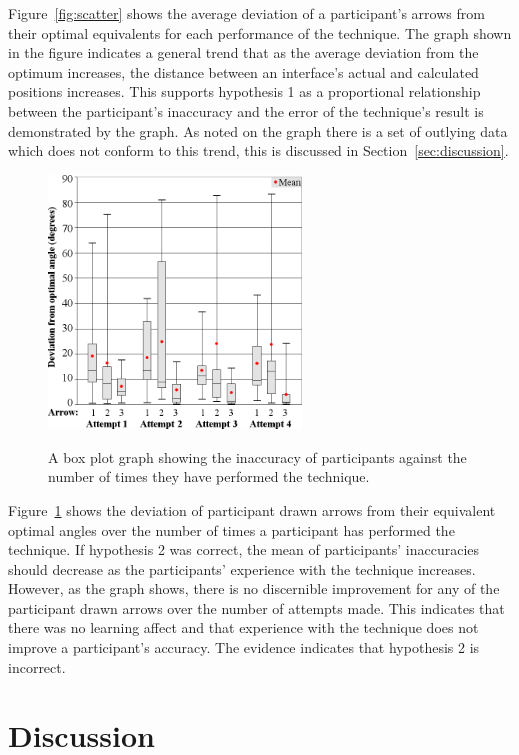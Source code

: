 \documentclass{bmcart}
\begin{document}
Figure~\ref{fig:scatter} shows the average deviation of a participant's arrows from their optimal equivalents for each performance of the technique.
The graph shown in the figure indicates a general trend that as the average deviation from the optimum increases, the distance between an interface's actual and calculated positions increases.
This supports hypothesis 1 as a proportional relationship between the participant's inaccuracy and the error of the technique's result is demonstrated by the graph.
As noted on the graph there is a set of outlying data which does not conform to this trend, this is discussed in Section~\ref{sec:discussion}.

\begin{figure}[h]
   \centering
   \caption{A box plot graph showing the inaccuracy of participants against the number of times they have performed the technique.}
   \includegraphics[width=0.6\textwidth]{figures/angle_deviation_boxplots.png}
   \label{fig:boxPlot}
\end{figure}

Figure~\ref{fig:boxPlot} shows the deviation of participant drawn arrows from their equivalent optimal angles over the number of times a participant has performed the technique.
If hypothesis 2 was correct, the mean of participants' inaccuracies should decrease as the participants' experience with the technique increases.
However, as the graph shows, there is no discernible improvement for any of the participant drawn arrows over the number of attempts made.
This indicates that there was no learning affect and that experience with the technique does not improve a participant's accuracy.
The evidence indicates that hypothesis 2 is incorrect.


\section*{Discussion}\label{sec:discussion}
\end{document}

